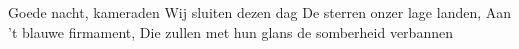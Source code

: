 \beginverse*
Goede nacht, kameraden
Wij sluiten dezen dag
De sterren onzer lage landen,
Aan 't blauwe firmament,
Die zullen met hun glans de somberheid verbannen
\endverse
\endsong